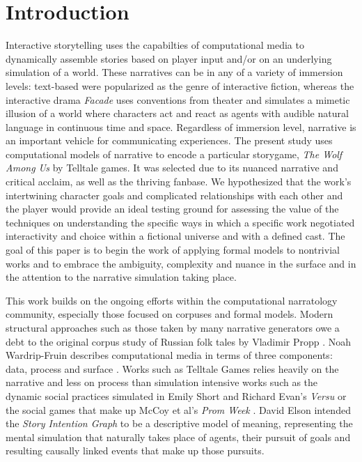 \section{Introduction}
\label{sec:orgheadline2}
Interactive storytelling uses the capabilties of computational media
to dynamically assemble stories based on player input and/or on an
underlying simulation of a world. These narratives can be in any of a
variety of immersion levels: text-based were popularized as the genre
of interactive fiction, whereas the interactive drama \emph{Facade}
\cite{Mateas2005} uses conventions from theater and simulates a
mimetic illusion of a world where characters act and react as agents
with audible natural language in continuous time and space. Regardless
of immersion level, narrative is an important vehicle for
communicating experiences. The present study uses computational models
of narrative to encode a particular storygame, \emph{The Wolf Among Us} by
Telltale games. It was selected due to its nuanced narrative and
critical acclaim, as well as the thriving fanbase. We hypothesized
that the work's intertwining character goals and complicated
relationships with each other and the player would provide an ideal
testing ground for assessing the value of the techniques on
understanding the specific ways in which a specific work negotiated
interactivity and choice within a fictional universe and with a
defined cast. The goal of this paper is to begin the work of applying
formal models to nontrivial works and to embrace the ambiguity,
complexity and nuance in the surface and in the attention to the
narrative simulation taking place.

This work builds on the ongoing efforts within the computational
narratology community, especially those focused on corpuses and formal
models. Modern structural approaches such as those taken by many
narrative generators owe a debt to the original corpus study of
Russian folk tales by Vladimir Propp \cite{Propp1928}.  Noah
Wardrip-Fruin describes computational media in terms of three
components: data, process and surface \cite{Wardrip-Fruin2009a}. Works
such as Telltale Games relies heavily on the narrative and less on
process than simulation intensive works such as the dynamic social
practices simulated in Emily Short and Richard Evan's \emph{Versu}
\cite{Evans2014} or the social games that make up McCoy et al's \emph{Prom
Week} \cite{McCoy2014a}. David Elson intended the \emph{Story Intention
Graph} to be a descriptive model of meaning, representing the mental
simulation that naturally takes place of agents, their pursuit of
goals and resulting causally linked events that make up those
pursuits.

